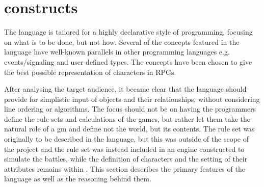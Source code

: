 \section{\langname{} constructs}
The \langname{} language is tailored for a highly declarative style of programming, focusing on what is to be done, but not how. Several of the concepts featured in the language have well-known
parallels in other programming languages e.g. events/signaling and user-defined types. The concepts have been chosen to give the best possible representation of characters in RPGs.

After analysing the target audience, it became clear that the language should provide for
simplistic input of objects and their relationships, without considering line
ordering or algorithms. The focus should not be on having the programmers define the rule sets
and calculations of the games, but rather let them take the natural role of a \ac{gm}
and define not the world, but its contents. The rule set was originally to be described in the
language, but this was outside of the scope of the project and the rule set was instead included in an engine constructed to simulate the battles, while the definition of characters and the setting of their attributes remains within \langname{}. This section describes the primary features of the
\langname{} language as well as the reasoning behind them.
